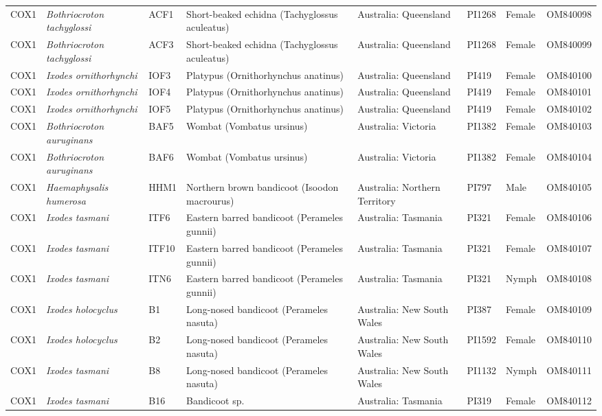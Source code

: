 \documentclass[a4paper, nobind]{templates/ociamthesis}
\begin{document}
\begin{landscape}
\begin{longtable}[t]{l>{}lllllll}
\endfoot
\bottomrule
\endlastfoot
COX1 & \em{Bothriocroton tachyglossi} & ACF1 & Short-beaked echidna (Tachyglossus aculeatus) & Australia: Queensland & PI1268 & Female & OM840098\\
COX1 & \em{Bothriocroton tachyglossi} & ACF3 & Short-beaked echidna (Tachyglossus aculeatus) & Australia: Queensland & PI1268 & Female & OM840099\\
COX1 & \em{Ixodes ornithorhynchi} & IOF3 & Platypus (Ornithorhynchus anatinus) & Australia: Queensland & PI419 & Female & OM840100\\
COX1 & \em{Ixodes ornithorhynchi} & IOF4 & Platypus (Ornithorhynchus anatinus) & Australia: Queensland & PI419 & Female & OM840101\\
COX1 & \em{Ixodes ornithorhynchi} & IOF5 & Platypus (Ornithorhynchus anatinus) & Australia: Queensland & PI419 & Female & OM840102\\
COX1 & \em{Bothriocroton auruginans} & BAF5 & Wombat (Vombatus ursinus) & Australia: Victoria & PI1382 & Female & OM840103\\
COX1 & \em{Bothriocroton auruginans} & BAF6 & Wombat (Vombatus ursinus) & Australia: Victoria & PI1382 & Female & OM840104\\
COX1 & \em{Haemaphysalis humerosa} & HHM1 & Northern brown bandicoot (Isoodon macrourus) & Australia: Northern Territory & PI797 & Male & OM840105\\
COX1 & \em{Ixodes tasmani} & ITF6 & Eastern barred bandicoot (Perameles gunnii) & Australia: Tasmania & PI321 & Female & OM840106\\
COX1 & \em{Ixodes tasmani} & ITF10 & Eastern barred bandicoot (Perameles gunnii) & Australia: Tasmania & PI321 & Female & OM840107\\
COX1 & \em{Ixodes tasmani} & ITN6 & Eastern barred bandicoot (Perameles gunnii) & Australia: Tasmania & PI321 & Nymph & OM840108\\
COX1 & \em{Ixodes holocyclus} & B1 & Long-nosed bandicoot (Perameles nasuta) & Australia: New South Wales & PI387 & Female & OM840109\\
COX1 & \em{Ixodes holocyclus} & B2 & Long-nosed bandicoot (Perameles nasuta) & Australia: New South Wales & PI1592 & Female & OM840110\\
COX1 & \em{Ixodes tasmani} & B8 & Long-nosed bandicoot (Perameles nasuta) & Australia: New South Wales & PI1132 & Nymph & OM840111\\
COX1 & \em{Ixodes tasmani} & B16 & Bandicoot sp. & Australia: Tasmania & PI319 & Female & OM840112\\

\end{longtable}
\end{landscape}
\end{document}
